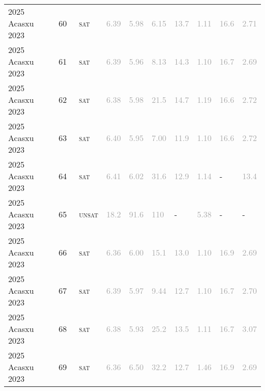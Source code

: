 \begin{center}
{\begin{longtable}{@{}llllllllll@{}}
2025 Acasxu 2023 & 60 & ~\textsc{sat} & \textcolor{darkgray}{6.39} & \textcolor{darkgray}{5.98} & \textcolor{darkgray}{6.15} & \textcolor{darkgray}{13.7} & \textcolor{darkgray}{1.11} & \textcolor{darkgray}{16.6} & \textcolor{darkgray}{2.71} \\
2025 Acasxu 2023 & 61 & ~\textsc{sat} & \textcolor{darkgray}{6.39} & \textcolor{darkgray}{5.96} & \textcolor{darkgray}{8.13} & \textcolor{darkgray}{14.3} & \textcolor{darkgray}{1.10} & \textcolor{darkgray}{16.7} & \textcolor{darkgray}{2.69} \\
2025 Acasxu 2023 & 62 & ~\textsc{sat} & \textcolor{darkgray}{6.38} & \textcolor{darkgray}{5.98} & \textcolor{darkgray}{21.5} & \textcolor{darkgray}{14.7} & \textcolor{darkgray}{1.19} & \textcolor{darkgray}{16.6} & \textcolor{darkgray}{2.72} \\
2025 Acasxu 2023 & 63 & ~\textsc{sat} & \textcolor{darkgray}{6.40} & \textcolor{darkgray}{5.95} & \textcolor{darkgray}{7.00} & \textcolor{darkgray}{11.9} & \textcolor{darkgray}{1.10} & \textcolor{darkgray}{16.6} & \textcolor{darkgray}{2.72} \\
2025 Acasxu 2023 & 64 & ~\textsc{sat} & \textcolor{darkgray}{6.41} & \textcolor{darkgray}{6.02} & \textcolor{darkgray}{31.6} & \textcolor{darkgray}{12.9} & \textcolor{darkgray}{1.14} & - & \textcolor{darkgray}{13.4} \\
2025 Acasxu 2023 & 65 & ~\textsc{unsat} & \textcolor{darkgray}{18.2} & \textcolor{darkgray}{91.6} & \textcolor{darkgray}{110} & - & \textcolor{darkgray}{5.38} & - & - \\
2025 Acasxu 2023 & 66 & ~\textsc{sat} & \textcolor{darkgray}{6.36} & \textcolor{darkgray}{6.00} & \textcolor{darkgray}{15.1} & \textcolor{darkgray}{13.0} & \textcolor{darkgray}{1.10} & \textcolor{darkgray}{16.9} & \textcolor{darkgray}{2.69} \\
2025 Acasxu 2023 & 67 & ~\textsc{sat} & \textcolor{darkgray}{6.39} & \textcolor{darkgray}{5.97} & \textcolor{darkgray}{9.44} & \textcolor{darkgray}{12.7} & \textcolor{darkgray}{1.10} & \textcolor{darkgray}{16.7} & \textcolor{darkgray}{2.70} \\
2025 Acasxu 2023 & 68 & ~\textsc{sat} & \textcolor{darkgray}{6.38} & \textcolor{darkgray}{5.93} & \textcolor{darkgray}{25.2} & \textcolor{darkgray}{13.5} & \textcolor{darkgray}{1.11} & \textcolor{darkgray}{16.7} & \textcolor{darkgray}{3.07} \\
2025 Acasxu 2023 & 69 & ~\textsc{sat} & \textcolor{darkgray}{6.36} & \textcolor{darkgray}{6.50} & \textcolor{darkgray}{32.2} & \textcolor{darkgray}{12.7} & \textcolor{darkgray}{1.46} & \textcolor{darkgray}{16.9} & \textcolor{darkgray}{2.69} \\

\end{longtable}}
\end{center}
